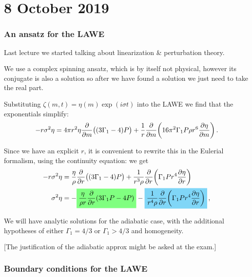 \documentclass[main.tex]{subfiles}
\begin{document}
\section*{8 October 2019}

\subsubsection{An ansatz for the LAWE}

Last lecture we started talking about linearization \& perturbation theory.

We use a complex spinning ansatz, which is by itself not physical, however its conjugate is also a solution so after we have found a solution we just need to take the real part.

Substituting \(\zeta (m, t) = \eta (m) \exp(i \sigma t)\) into the LAWE we find that the exponentials simplify: 
%
\begin{align}
-r \sigma^2 \eta  =
4 \pi r^2 \eta \pdv{}{m} \qty((3 \Gamma_1 - 4)P)+
\frac{1}{r} \pdv{}{m} \qty(16 \pi^2 \Gamma_1 P \rho r^6 \pdv{\eta }{m} )  
\,.
\end{align}

Since we have an explicit \(r\), it is convenient to rewrite this in the Eulerial formalism, using the continuity equation: we get 
%
\begin{subequations}
\begin{align}
- r \sigma^2 \eta &= 
\frac{\eta }{\rho } \pdv{}{r} \qty((3\Gamma_1 - 4) P)
+ \frac{1}{r^3 \rho } \pdv{}{r} \qty(\Gamma_1 P r^{4} \pdv{\eta }{r})  \\
\sigma^2 \eta  &= - \hlc{green}{\frac{\eta }{\rho r} \pdv{}{r} \qty(3 \Gamma_1 P - 4P )} -\hlc{cyan}{\frac{1}{r^{4} \rho } \pdv{}{r} \qty(\Gamma_1 P r^{4} \pdv{\eta }{r})}
\,, \label{eq:linear-operator-LAWE}
\end{align}
\end{subequations}
%

We will have analytic solutions for the adiabatic case, with the additional hypotheses of either \(\Gamma_1 = 4/3\) or \(\Gamma_1 > 4/3\) and homogeneity.

[The justification of the adiabatic approx might be asked at the exam.]

\subsubsection{Boundary conditions for the LAWE}
\end{document}
